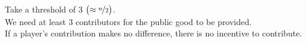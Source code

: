 \documentclass[preview, varwidth=9cm, border={0pt 1pt 0pt 1pt}]{standalone} %
\begin{document}







    Take a threshold of \(3\) \(\big({\approx\nicefrac{n}{2}}\big)\).\\

    We need at least \(3\) contributors for the public good to be provided.\\ 

    If a player's contribution makes no difference, 
    there is no incentive to contribute.

    
\end{document}
